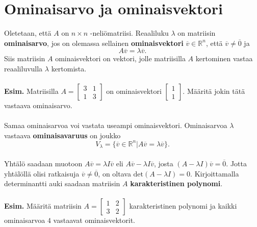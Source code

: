 \documentclass{article}
\begin{document}
\section{Ominaisarvo ja ominaisvektori}
Oletetaan, että \(A\) on \(n\times n\) -neliömatriisi. Reaaliluku \(\lambda\) on matriisin \textbf{ominaisarvo}, jos on olemassa sellainen \textbf{ominaisvektori} \(\overline{v}\in \mathbb{R}^n\), että \(\overline{v}\neq \overline{0}\) ja $$A\overline{v}=\lambda \overline{v}.$$ Siis matriisin \(A\) ominaisvektori on vektori, jolle matriisilla \(A\)
kertominen vastaa reaaliluvulla \(\lambda\) kertomista.\\
 \\
\textbf{Esim.} Matriisilla \(A=\begin{bmatrix} 3 & 1 \\ 1 & 3\end{bmatrix}\) on ominaisvektori \(\begin{bmatrix} 1 \\ 1\end{bmatrix}\). Määritä jokin tätä vastaava ominaisarvo.\\
 \\
Samaa ominaisarvoa voi vastata useampi ominaisvektori. Ominaisarvoa \(\lambda\) vastaava \textbf{ominaisavaruus} on joukko $$V_\lambda =\{\overline{v}\in \mathbb{R}^n | A\overline{v}=\lambda \overline{v}\}.$$
\\
Yhtälö saadaan muotoon \(A\overline{v}=\lambda I\overline{v}\) eli \(A\overline{v}-\lambda I\overline{v}\), josta \((A-\lambda I)\overline{v}=\overline{0}\). Jotta yhtälöllä olisi ratkaisuja \(\overline{v}\neq \overline{0}\), on oltava \(\text{det}(A-\lambda I)=0\). Kirjoittamalla determinantti auki saadaan matriisin \(A\) \textbf{karakteristinen polynomi}.\\
 \\
\textbf{Esim.} Määritä matriisin \(A=\begin{bmatrix} 1 & 2 \\ 3 & 2\end{bmatrix}\) karakteristinen polynomi ja kaikki ominaisarvoa \(4\) vastaavat ominaisvektorit.

\newpage
\end{document}
